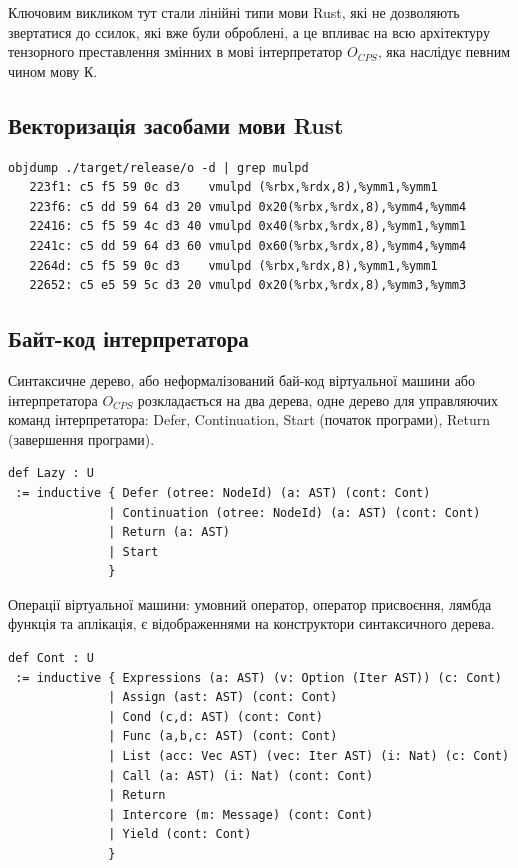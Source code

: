 \documentclass{article}
\begin{document}
Ключовим викликом тут стали лінійні типи мови Rust, які не дозволяють
звертатися до ссилок, які вже були оброблені, а це впливає на всю
архітектуру тензорного преставлення змінних в мові інтерпретатор $O_{CPS}$,
яка наслідує певним чином мову К.

\newpage
\subsection{Векторизація засобами мови Rust}

\begin{lstlisting}
objdump ./target/release/o -d | grep mulpd
   223f1: c5 f5 59 0c d3    vmulpd (%rbx,%rdx,8),%ymm1,%ymm1
   223f6: c5 dd 59 64 d3 20 vmulpd 0x20(%rbx,%rdx,8),%ymm4,%ymm4
   22416: c5 f5 59 4c d3 40 vmulpd 0x40(%rbx,%rdx,8),%ymm1,%ymm1
   2241c: c5 dd 59 64 d3 60 vmulpd 0x60(%rbx,%rdx,8),%ymm4,%ymm4
   2264d: c5 f5 59 0c d3    vmulpd (%rbx,%rdx,8),%ymm1,%ymm1
   22652: c5 e5 59 5c d3 20 vmulpd 0x20(%rbx,%rdx,8),%ymm3,%ymm3
\end{lstlisting}

\subsection{Байт-код інтерпретатора}
Синтаксичне дерево, або неформалізований бай-код віртуальної
машини або інтерпретатора $O_{CPS}$ розкладається на два дерева, одне дерево
для управляючих команд інтерпретатора: Defer, Continuation, Start (початок програми),
Return (завершення програми).

\begin{lstlisting}
def Lazy : U
 := inductive { Defer (otree: NodeId) (a: AST) (cont: Cont)
              | Continuation (otree: NodeId) (a: AST) (cont: Cont)
              | Return (a: AST)
              | Start
              }
\end{lstlisting}

Операції віртуальної машини: умовний оператор, оператор присвоєння, лямбда
функція та аплікація, є відображеннями на конструктори синтаксичного дерева.

\begin{lstlisting}
def Cont : U
 := inductive { Expressions (a: AST) (v: Option (Iter AST)) (c: Cont)
              | Assign (ast: AST) (cont: Cont)
              | Cond (c,d: AST) (cont: Cont)
              | Func (a,b,c: AST) (cont: Cont)
              | List (acc: Vec AST) (vec: Iter AST) (i: Nat) (c: Cont)
              | Call (a: AST) (i: Nat) (cont: Cont)
              | Return
              | Intercore (m: Message) (cont: Cont)
              | Yield (cont: Cont)
              }
\end{lstlisting}
\end{document}
